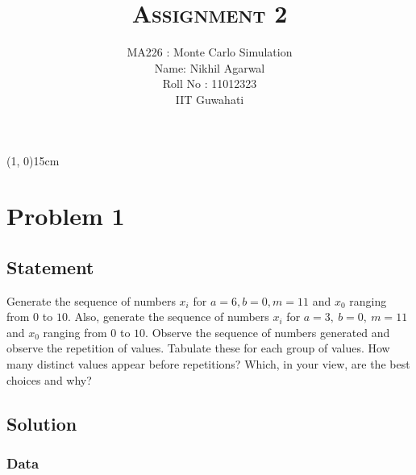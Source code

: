 \documentclass[10pt]{article}
\begin{document}
\title{\textbf{\textsc{Assignment 2}}}
\author{MA226 : Monte Carlo Simulation \\
			Name: Nikhil Agarwal \\
			Roll No : 11012323 \\
			IIT Guwahati}
\date{}
\maketitle

\begin{center}
	\line(1, 0){15cm}
\end{center}

\section{Problem 1}

\subsection{Statement}

Generate the sequence of numbers $x_{i}$ for $a = 6, b = 0, m = 11$ and $x_0$ ranging from $0$ to $10$. Also, generate the sequence of numbers $x_i$ for $a = 3,\: b = 0,\: m = 11$ and $x_0$ ranging from $0$ to $10$. Observe the sequence of numbers generated and observe the repetition of values. Tabulate these for each group of values. How many distinct values appear before repetitions? Which, in your view, are the best choices and why?

\subsection{Solution}

\subsubsection{Data}
\end{document}
